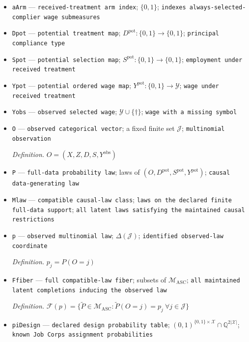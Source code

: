 \documentclass{article}
\begin{document}
\begin{itemize}
  \item \texttt{aArm} --- \texttt{received-\allowbreak{}treatment arm index}; \(\{0,1\}\); \texttt{indexes always-\allowbreak{}selected-\allowbreak{}complier wage submeasures}
  \item \texttt{Dpot} --- \texttt{potential treatment map}; \(D^{\mathrm{pot}}:\{0,1\}\to\{0,1\}\); \texttt{principal compliance type}
  \item \texttt{Spot} --- \texttt{potential selection map}; \(S^{\mathrm{pot}}:\{0,1\}\to\{0,1\}\); \texttt{employment under received treatment}
  \item \texttt{Ypot} --- \texttt{potential ordered wage map}; \(Y^{\mathrm{pot}}:\{0,1\}\to\mathcal Y\); \texttt{wage under received treatment}
  \item \texttt{Yobs} --- \texttt{observed selected wage}; \(\mathcal Y\cup\{\dagger\}\); \texttt{wage with a missing symbol}
  \item \texttt{O} --- \texttt{observed categorical vector}; a fixed finite set \(\mathcal J\); \texttt{multinomial observation}
  \par\smallskip\noindent\emph{Definition.} \(O=(X,Z,D,S,Y^{\mathrm{obs}})\)
  \item \texttt{P} --- \texttt{full-\allowbreak{}data probability law}; laws of \((O,D^{\mathrm{pot}},S^{\mathrm{pot}},Y^{\mathrm{pot}})\); \texttt{causal data-\allowbreak{}generating law}
  \item \texttt{Mlaw} --- \texttt{compatible causal-\allowbreak{}law class}; \texttt{laws on the declared finite full-\allowbreak{}data support}; \texttt{all latent laws satisfying the maintained causal restrictions}
  \item \texttt{p} --- \texttt{observed multinomial law}; \(\Delta(\mathcal J)\); \texttt{identified observed-\allowbreak{}law coordinate}
  \par\smallskip\noindent\emph{Definition.} \(p_j=P(O=j)\)
  \item \texttt{Ffiber} --- \texttt{full compatible-\allowbreak{}law fiber}; subsets of \(\mathcal M_{\mathrm{ASC}}\); \texttt{all maintained latent completions inducing the observed law}
  \par\smallskip\noindent\emph{Definition.} \(\mathcal F(p)=\{\widetilde P\in\mathcal M_{\mathrm{ASC}}:\widetilde P(O=j)=p_j\ \forall j\in\mathcal J\}\)
  \item \texttt{piDesign} --- \texttt{declared design probability table}; \((0,1)^{\{0,1\}\times\mathcal X}\cap\mathbb Q^{2|\mathcal X|}\); \texttt{known Job Corps assignment probabilities}

\end{itemize}
\end{document}
